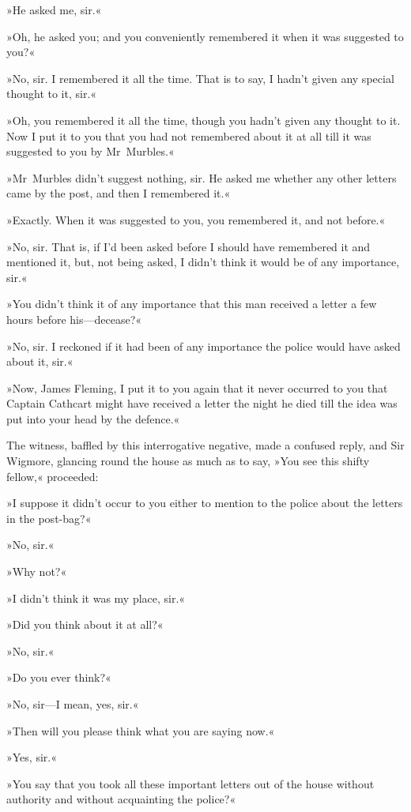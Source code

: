 »He asked me, sir.«

»Oh, he asked you; and you conveniently remembered it when it was suggested to you?«

»No, sir. I remembered it all the time. That is to say, I hadn't given any special thought to it, sir.«

»Oh, you remembered it all the time, though you hadn't given any thought to it. Now I put it to you that you had not remembered about it at all till it was suggested to you by Mr~Murbles.«

»Mr~Murbles didn't suggest nothing, sir. He asked me whether any other letters came by the post, and then I remembered it.«

»Exactly. When it was suggested to you, you remembered it, and not before.«

»No, sir. That is, if I'd been asked before I should have remembered it and mentioned it, but, not being asked, I didn't think it would be of any importance, sir.«

»You didn't think it of any importance that this man received a letter a few hours before his—decease?«

»No, sir. I reckoned if it had been of any importance the police would have asked about it, sir.«

»Now, James Fleming, I put it to you again that it never occurred to you that Captain Cathcart might have received a letter the night he died till the idea was put into your head by the defence.«

The witness, baffled by this interrogative negative, made a confused reply, and Sir Wigmore, glancing round the house as much as to say, »You see this shifty fellow,« proceeded:

»I suppose it didn't occur to you either to mention to the police about the letters in the post-bag?«

»No, sir.«

»Why not?«

»I didn't think it was my place, sir.«

»Did you think about it at all?«

»No, sir.«

»Do you ever think?«

»No, sir—I mean, yes, sir.«

»Then will you please think what you are saying now.«

»Yes, sir.«

»You say that you took all these important letters out of the house without authority and without acquainting the police?«

